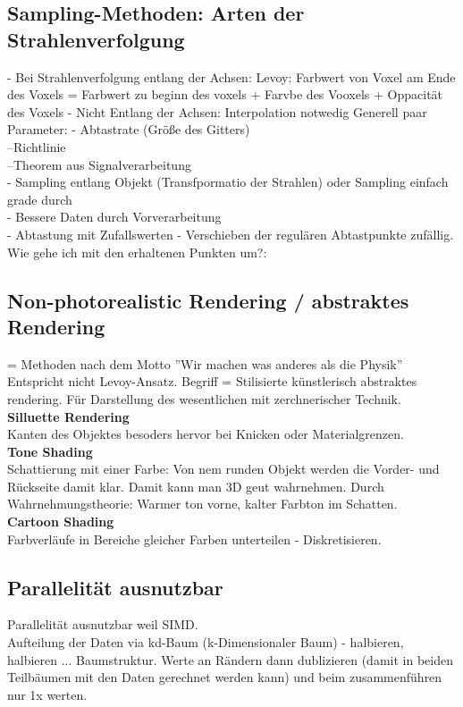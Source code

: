 \documentclass{article}
\begin{document}
\subsection{Sampling-Methoden: Arten der Strahlenverfolgung}
- Bei Strahlenverfolgung entlang der Achsen: Levoy: Farbwert von Voxel am Ende des Voxels = Farbwert zu beginn des voxels + Farvbe des Vooxels + Oppacität des Voxels
- Nicht Entlang der Achsen: Interpolation notwedig
Generell paar Parameter:
- Abtastrate  (Größe des Gitters)\\
--Richtlinie\\
--Theorem aus Signalverarbeitung\\
- Sampling entlang Objekt (Transfpormatio der Strahlen) oder Sampling einfach grade durch\\
- Bessere Daten durch Vorverarbeitung\\
- Abtastung mit Zufallswerten - Verschieben der regulären Abtastpunkte zufällig.\\

Wie gehe ich mit den erhaltenen Punkten um?:


\subsection{Non-photorealistic Rendering / abstraktes Rendering }
= Methoden nach dem Motto ''Wir machen was anderes als die Physik'' \\
Entspricht nicht Levoy-Ansatz. Begriff = Stilisierte künstlerisch abstraktes rendering. Für Darstellung des wesentlichen mit zerchnerischer Technik.\\

\noindent \textbf{Silluette Rendering}\\
Kanten des Objektes besoders hervor bei Knicken oder Materialgrenzen.\\

\noindent \textbf{Tone Shading}\\
Schattierung mit einer Farbe: Von nem runden Objekt werden die Vorder- und Rückseite damit klar. Damit kann man 3D geut wahrnehmen. Durch Wahrnehmungstheorie: Warmer ton vorne, kalter Farbton im Schatten.\\

\noindent \textbf{Cartoon Shading}\\
Farbverläufe in Bereiche gleicher Farben unterteilen - Diskretisieren.\\


\subsection{Parallelität ausnutzbar}
Parallelität ausnutzbar weil SIMD.\\
Aufteilung der Daten via kd-Baum (k-Dimensionaler Baum) - halbieren, halbieren ... Baumstruktur. Werte an Rändern dann dublizieren (damit in beiden Teilbäumen mit den Daten gerechnet werden kann) und beim zusammenführen nur 1x werten.
\end{document}
